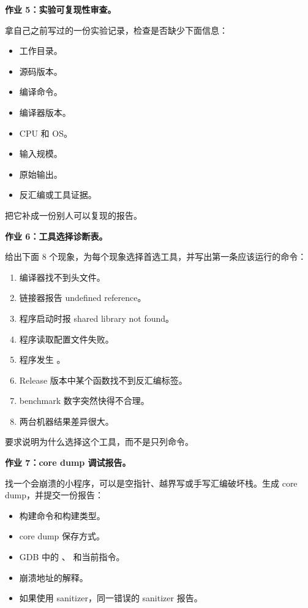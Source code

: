 \begin{exercisebox}
\textbf{作业 5：实验可复现性审查。}

拿自己之前写过的一份实验记录，检查是否缺少下面信息：

\begin{itemize}
  \item 工作目录。
  \item 源码版本。
  \item 编译命令。
  \item 编译器版本。
  \item CPU 和 OS。
  \item 输入规模。
  \item 原始输出。
  \item 反汇编或工具证据。
\end{itemize}

把它补成一份别人可以复现的报告。

\textbf{作业 6：工具选择诊断表。}

给出下面 8 个现象，为每个现象选择首选工具，并写出第一条应该运行的命令：

\begin{enumerate}
  \item 编译器找不到头文件。
  \item 链接器报告 undefined reference。
  \item 程序启动时报 shared library not found。
  \item 程序读取配置文件失败。
  \item 程序发生 。
  \item Release 版本中某个函数找不到反汇编标签。
  \item benchmark 数字突然快得不合理。
  \item 两台机器结果差异很大。
\end{enumerate}

要求说明为什么选择这个工具，而不是只列命令。

\textbf{作业 7：core dump 调试报告。}

找一个会崩溃的小程序，可以是空指针、越界写或手写汇编破坏栈。生成 core dump，并提交一份报告：

\begin{itemize}
  \item 构建命令和构建类型。
  \item core dump 保存方式。
  \item GDB 中的 、 和当前指令。
  \item 崩溃地址的解释。
  \item 如果使用 sanitizer，同一错误的 sanitizer 报告。
\end{itemize}


\end{exercisebox}
